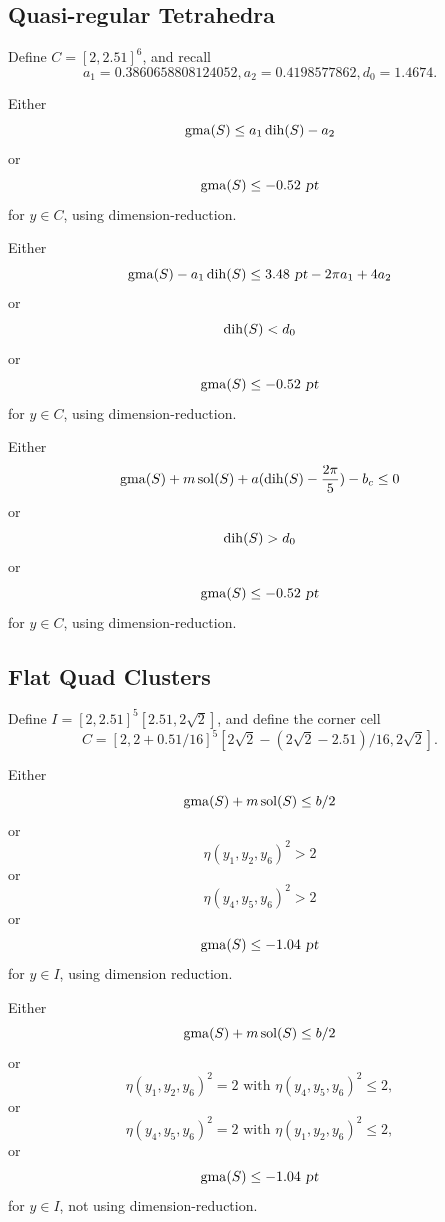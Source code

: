 

\subsection{Quasi-regular Tetrahedra}

Define $C = [2,2.51]^6$, and recall
\[
a_1 = 0.3860658808124052, a_2 = 0.4198577862,
d_0 = 1.4674.\]

\begin{calcf}
Either
 \[\operatorname{gma}(S) \le a_1 \operatorname{dih}(S) - a_2\]
or
 \[\operatorname{gma}(S) \le -0.52\text{ \sl pt}\]
for $y \in C$, using dimension-reduction.
 \label{qr:dihrel}
\end{calcf}

\begin{calcf}
Either
\[\operatorname{gma}(S) - a_1 \operatorname{dih}(S) \le 3.48 \text{ \sl pt} - 2 \pi a_1 + 4 a_2\]
or
\[\operatorname{dih}(S) < d_0\]
or
\[\operatorname{gma}(S) \le -0.52\text{ \sl pt}\]
for $y \in C$, using dimension-reduction.
\label{qr:dihcut}
\end{calcf}

\begin{calcf}
Either
\[\operatorname{gma}(S) + m \operatorname{sol}(S) + a( \operatorname{dih}(S) -
\frac{2\pi}{5}) - b_c \le 0\]
or
\[\operatorname{dih}(S) > d_0\]
or
\[\operatorname{gma}(S) \le -0.52\text{ \sl pt}\]
for $y \in C$, using dimension-reduction.
\label{qr:pentacap}
\end{calcf}


\subsection{Flat Quad Clusters}

Define $I = [2,2.51]^5[2.51,2\sqrt{2}]$, and define the
corner cell
\[C = [2,2 + 0.51/16]^5[2\sqrt{2} - (2\sqrt{2}-2.51)/16,2\sqrt{2}].\]

\begin{calcf}
Either
\[\operatorname{gma}(S) + m \operatorname{sol}(S) \le b/2\]
or
\[\eta(y_1,y_2,y_6)^2 > 2\]
or
\[\eta(y_4, y_5, y_6)^2 > 2\]
or
\[\operatorname{gma}(S) \le -1.04\text{ \sl pt}\]
for $y \in I$, using dimension reduction.
\label{flat:gma:dimred}
\end{calcf}

\begin{calcf}
Either
\[\operatorname{gma}(S) + m \operatorname{sol}(S) \le b/2\]
or
\[\eta(y_1,y_2,y_6)^2 = 2 \text{~with~} \eta(y_4, y_5, y_6)^2 \le 2,\]
or
\[\eta(y_4, y_5, y_6)^2 = 2 \text{~with~} \eta(y_1,y_2,y_6)^2 \le 2,\]
or
\[\operatorname{gma}(S) \le -1.04\text{ \sl pt}\]
for $y \in I$, not using dimension-reduction.
\label{flat:gma:bdry}
\end{calcf}

